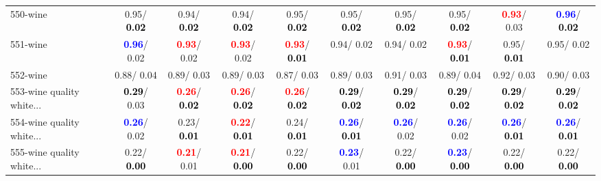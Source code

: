 \begin{table}[h]
\begin{center}
{\begin{tabular}{lc|c|c|c|c|c|c|c|c}
550-wine &   0.95/\textcolor{black}{\textbf{  0.02}} &   0.94/\textcolor{black}{\textbf{  0.02}} &   0.94/\textcolor{black}{\textbf{  0.02}} &   0.95/\textcolor{black}{\textbf{  0.02}} &   0.95/\textcolor{black}{\textbf{  0.02}} &   0.95/\textcolor{black}{\textbf{  0.02}} &   0.95/\textcolor{black}{\textbf{  0.02}} & \textcolor{red}{\textbf{  0.93}}/  0.03 & \textcolor{blue}{\textbf{  0.96}}/\textcolor{black}{\textbf{  0.02}} \\
551-wine & \textcolor{blue}{\textbf{  0.96}}/  0.02 & \textcolor{red}{\textbf{  0.93}}/  0.02 & \textcolor{red}{\textbf{  0.93}}/  0.02 & \textcolor{red}{\textbf{  0.93}}/\textcolor{black}{\textbf{  0.01}} &   0.94/  0.02 &   0.94/  0.02 & \textcolor{red}{\textbf{  0.93}}/\textcolor{black}{\textbf{  0.01}} &   0.95/\textcolor{black}{\textbf{  0.01}} &   0.95/  0.02 \\ \hline
552-wine &   0.88/  0.04 &   0.89/  0.03 &   0.89/  0.03 &   0.87/  0.03 &   0.89/  0.03 &   0.91/  0.03 &   0.89/  0.04 &   0.92/  0.03 &   0.90/  0.03 \\
553-wine quality white... & \textcolor{black}{\textbf{  0.29}}/  0.03 & \textcolor{red}{\textbf{  0.26}}/\textcolor{black}{\textbf{  0.02}} & \textcolor{red}{\textbf{  0.26}}/\textcolor{black}{\textbf{  0.02}} & \textcolor{red}{\textbf{  0.26}}/\textcolor{black}{\textbf{  0.02}} & \textcolor{black}{\textbf{  0.29}}/\textcolor{black}{\textbf{  0.02}} & \textcolor{black}{\textbf{  0.29}}/\textcolor{black}{\textbf{  0.02}} & \textcolor{black}{\textbf{  0.29}}/\textcolor{black}{\textbf{  0.02}} & \textcolor{black}{\textbf{  0.29}}/\textcolor{black}{\textbf{  0.02}} & \textcolor{black}{\textbf{  0.29}}/\textcolor{black}{\textbf{  0.02}} \\
554-wine quality white... & \textcolor{blue}{\textbf{  0.26}}/  0.02 &   0.23/\textcolor{black}{\textbf{  0.01}} & \textcolor{red}{\textbf{  0.22}}/\textcolor{black}{\textbf{  0.01}} &   0.24/\textcolor{black}{\textbf{  0.01}} & \textcolor{blue}{\textbf{  0.26}}/\textcolor{black}{\textbf{  0.01}} & \textcolor{blue}{\textbf{  0.26}}/  0.02 & \textcolor{blue}{\textbf{  0.26}}/  0.02 & \textcolor{blue}{\textbf{  0.26}}/\textcolor{black}{\textbf{  0.01}} & \textcolor{blue}{\textbf{  0.26}}/\textcolor{black}{\textbf{  0.01}} \\
555-wine quality white... &   0.22/\textcolor{black}{\textbf{  0.00}} & \textcolor{red}{\textbf{  0.21}}/  0.01 & \textcolor{red}{\textbf{  0.21}}/\textcolor{black}{\textbf{  0.00}} &   0.22/\textcolor{black}{\textbf{  0.00}} & \textcolor{blue}{\textbf{  0.23}}/  0.01 &   0.22/\textcolor{black}{\textbf{  0.00}} & \textcolor{blue}{\textbf{  0.23}}/\textcolor{black}{\textbf{  0.00}} &   0.22/\textcolor{black}{\textbf{  0.00}} &   0.22/\textcolor{black}{\textbf{  0.00}} \\

\end{tabular}}
\end{center}
\end{table}
